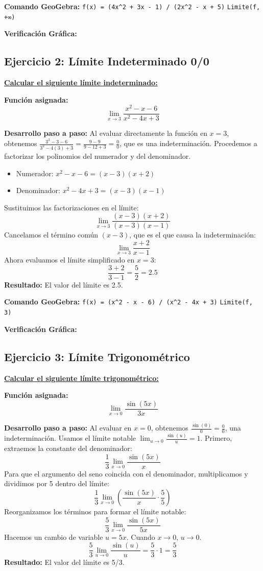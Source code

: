 \documentclass{article}
\begin{document}
\textbf{Comando GeoGebra:}
\texttt{f(x) = (4x\textasciicircum 2 + 3x - 1) / (2x\textasciicircum 2 - x + 5)}
\texttt{Limite(f, +∞)}

\textbf{Verificación Gráfica:}

\newpage

\subsection*{Ejercicio 2: Límite Indeterminado 0/0}
\underline{\textbf{Calcular el siguiente límite indeterminado:}}

\textbf{Función asignada:}
\[ \lim_{x \to 3} \frac{x^2 - x - 6}{x^2 - 4x + 3} \]

\textbf{Desarrollo paso a paso:}
Al evaluar directamente la función en $x=3$, obtenemos $\frac{3^2 - 3 - 6}{3^2 - 4(3) + 3} = \frac{9-9}{9-12+3} = \frac{0}{0}$, que es una indeterminación. Procedemos a factorizar los polinomios del numerador y del denominador.
\begin{itemize}
    \item Numerador: $x^2 - x - 6 = (x-3)(x+2)$
    \item Denominador: $x^2 - 4x + 3 = (x-3)(x-1)$
\end{itemize}
Sustituimos las factorizaciones en el límite:
\[ \lim_{x \to 3} \frac{(x-3)(x+2)}{(x-3)(x-1)} \]
Cancelamos el término común $(x-3)$, que es el que causa la indeterminación:
\[ \lim_{x \to 3} \frac{x+2}{x-1} \]
Ahora evaluamos el límite simplificado en $x=3$:
\[ \frac{3+2}{3-1} = \frac{5}{2} = 2.5 \]
\textbf{Resultado:} El valor del límite es 2.5.

\textbf{Comando GeoGebra:}
\texttt{f(x) = (x\textasciicircum 2 - x - 6) / (x\textasciicircum 2 - 4x + 3)}
\texttt{Limite(f, 3)}

\textbf{Verificación Gráfica:}

\newpage

\subsection*{Ejercicio 3: Límite Trigonométrico}
\underline{\textbf{Calcular el siguiente límite trigonométrico:}}

\textbf{Función asignada:}
\[ \lim_{x \to 0} \frac{\sin(5x)}{3x} \]

\textbf{Desarrollo paso a paso:}
Al evaluar en $x=0$, obtenemos $\frac{\sin(0)}{0} = \frac{0}{0}$, una indeterminación. Usamos el límite notable $\lim_{u \to 0} \frac{\sin(u)}{u} = 1$.
Primero, extraemos la constante del denominador:
\[ \frac{1}{3} \lim_{x \to 0} \frac{\sin(5x)}{x} \]
Para que el argumento del seno coincida con el denominador, multiplicamos y dividimos por 5 dentro del límite:
\[ \frac{1}{3} \lim_{x \to 0} \left( \frac{\sin(5x)}{x} \cdot \frac{5}{5} \right) \]
Reorganizamos los términos para formar el límite notable:
\[ \frac{5}{3} \lim_{x \to 0} \frac{\sin(5x)}{5x} \]
Hacemos un cambio de variable $u = 5x$. Cuando $x \to 0$, $u \to 0$.
\[ \frac{5}{3} \lim_{u \to 0} \frac{\sin(u)}{u} = \frac{5}{3} \cdot 1 = \frac{5}{3} \]
\textbf{Resultado:} El valor del límite es 5/3.
\end{document}
